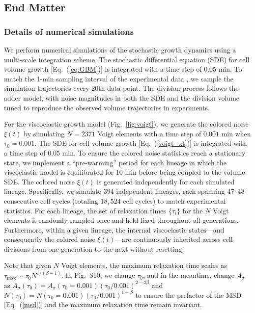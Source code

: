 \documentclass[aps, prl, twocolumn, longbibliography, linenumbers, superscriptaddress]{revtex4-2}
\begin{document}


\subsection{End Matter}
\subsubsection{Details of numerical simulations}
We perform numerical simulations of the stochastic growth dynamics using a multi-scale integration scheme. The stochastic differential equation (SDE) for cell volume growth [Eq.~(\ref{eq:GBM})] is integrated with a time step of $ 0.05$ min. To match the 1-min sampling interval of the experimental data \cite{Taheri2015cell}, we sample the simulation trajectories every 20th data point. The division process follows the adder model, with noise magnitudes in both the SDE and the division volume tuned to reproduce the observed volume trajectories in experiments.

For the viscoelastic growth model (Fig.~\ref{fig:voigt}), we generate the colored noise $\xi(t)$ by simulating $N=2371$ Voigt elements with a time step of $0.001$ min when $\tau_0 = 0.001$. The SDE for cell volume growth [Eq.~(\ref{voigt_xt})] is integrated with a time step of $0.05$ min. To ensure the colored noise statistics reach a stationary state, we implement a ``pre-warming'' period for each lineage in which the viscoelastic model is equilibrated for 10 min before being coupled to the volume SDE. The colored noise $\xi(t)$ is generated independently for each simulated lineage. Specifically, we simulate $394$ independent lineages, each spanning $47$--$48$ consecutive cell cycles (totaling $18,524$ cell cycles) to match experimental statistics. For each lineage, the set of relaxation times $\{\tau_i\}$ for the $N$ Voigt elements is randomly sampled once and held fixed throughout all generations. Furthermore, within a given lineage, the internal viscoelastic states—and consequently the colored noise $\xi(t)$—are continuously inherited across cell divisions from one generation to the next without resetting.

Note that given $N$ Voigt elements, the maximum relaxation time scales as $\tau_{\max}\sim \tau_0 N^{1/(\beta-1)}$. In Fig.~S10, we change $\tau_0$, and in the meantime, change $A_{\sigma}$ as $A_{\sigma}(\tau_0)=A_{\sigma}(\tau_0=0.001) (\tau_0/0.001)^{2-2\beta}$ and $N(\tau_0)=N(\tau_0=0.001) (\tau_0/0.001)^{1-\beta}$ to ensure the prefactor of the MSD [Eq.~(\ref{msd})] and the maximum relaxation time remain invariant.
\end{document}
